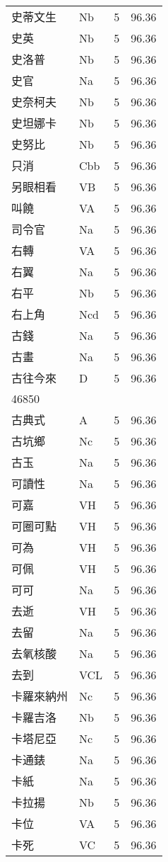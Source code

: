 \documentclass[twocolumn]{book}
\begin{document}
\begin{supertabular}{llrr}
史蒂文生 & Nb & 5 &  96.36\\
史英 & Nb & 5 &  96.36\\
史洛普 & Nb & 5 &  96.36\\
史官 & Na & 5 &  96.36\\
史奈柯夫 & Nb & 5 &  96.36\\
史坦娜卡 & Nb & 5 &  96.36\\
史努比 & Nb & 5 &  96.36\\
只消 & Cbb & 5 &  96.36\\
另眼相看 & VB & 5 &  96.36\\
叫饒 & VA & 5 &  96.36\\
司令官 & Na & 5 &  96.36\\
右轉 & VA & 5 &  96.36\\
右翼 & Na & 5 &  96.36\\
右平 & Nb & 5 &  96.36\\
右上角 & Ncd & 5 &  96.36\\
古錢 & Na & 5 &  96.36\\
古畫 & Na & 5 &  96.36\\
古往今來 & D & 5 &  96.36\\
46850\\
古典式 & A & 5 &  96.36\\
古坑鄉 & Nc & 5 &  96.36\\
古玉 & Na & 5 &  96.36\\
可讀性 & Na & 5 &  96.36\\
可嘉 & VH & 5 &  96.36\\
可圈可點 & VH & 5 &  96.36\\
可為 & VH & 5 &  96.36\\
可佩 & VH & 5 &  96.36\\
可可 & Na & 5 &  96.36\\
去逝 & VH & 5 &  96.36\\
去留 & Na & 5 &  96.36\\
去氧核酸 & Na & 5 &  96.36\\
去到 & VCL & 5 &  96.36\\
卡羅來納州 & Nc & 5 &  96.36\\
卡羅吉洛 & Nb & 5 &  96.36\\
卡塔尼亞 & Nc & 5 &  96.36\\
卡通錶 & Na & 5 &  96.36\\
卡紙 & Na & 5 &  96.36\\
卡拉揚 & Nb & 5 &  96.36\\
卡位 & VA & 5 &  96.36\\
卡死 & VC & 5 &  96.36\\

\end{supertabular}
\end{document}

